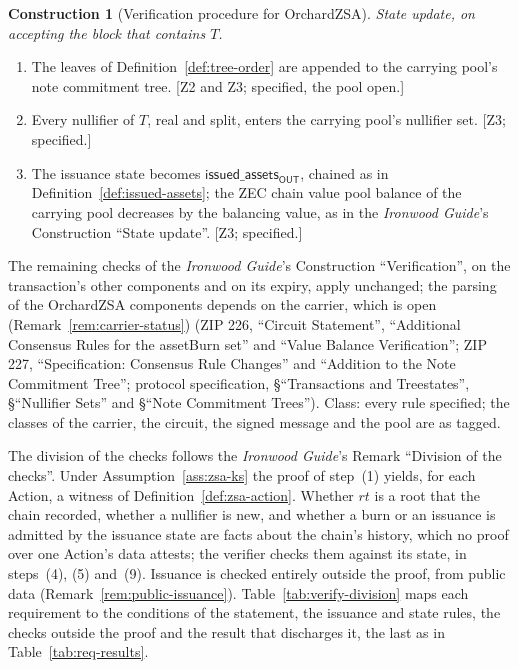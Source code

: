 \documentclass[11pt,a4paper]{article}
\theoremstyle{definition}
\newtheorem{construction}[theorem]{Construction}
\begin{document}
\begin{construction}[Verification procedure for OrchardZSA]
\emph{State update, on accepting the block that contains $T$.}
\begin{enumerate}[label=(\arabic*), leftmargin=2.4em, resume]
\item The leaves of Definition~\ref{def:tree-order} are appended to the
  carrying pool's note commitment tree. [Z2 and Z3; specified, the pool
  open.]
\item Every nullifier of $T$, real and split, enters the carrying pool's
  nullifier set. [Z3; specified.]
\item The issuance state becomes $\mathsf{issued\_assets}_{\mathsf{OUT}}$,
  chained as in Definition~\ref{def:issued-assets}; the ZEC chain value
  pool balance of the carrying pool decreases by the balancing value, as in
  the \emph{Ironwood Guide}'s Construction ``State update''. [Z3;
  specified.]
\end{enumerate}
The remaining checks of the \emph{Ironwood Guide}'s Construction
``Verification'', on the transaction's other components and on its expiry,
apply unchanged; the parsing of the OrchardZSA components depends on the
carrier, which is open (Remark~\ref{rem:carrier-status}) (ZIP 226,
``Circuit Statement'', ``Additional Consensus Rules for the assetBurn set''
and ``Value Balance Verification''; ZIP 227, ``Specification: Consensus Rule
Changes'' and ``Addition to the Note Commitment Tree''; protocol
specification, \S``Transactions and Treestates'', \S``Nullifier Sets'' and
\S``Note Commitment Trees''). Class: every rule specified; the classes of the
carrier, the circuit, the signed message and the pool are as tagged.
\end{construction}

The division of the checks follows the \emph{Ironwood Guide}'s Remark
``Division of the checks''. Under Assumption~\ref{ass:zsa-ks} the proof of
step~(1) yields, for each Action, a witness of
Definition~\ref{def:zsa-action}. Whether $\mathit{rt}$ is a root that the
chain recorded, whether a nullifier is new, and whether a burn or an
issuance is admitted by the issuance state are facts about the chain's
history, which no proof over one Action's data attests; the verifier checks
them against its state, in steps~(4), (5) and~(9). Issuance is checked
entirely outside the proof, from public data
(Remark~\ref{rem:public-issuance}). Table~\ref{tab:verify-division} maps
each requirement to the conditions of the statement, the issuance and state
rules, the checks outside the proof and the result that discharges it, the
last as in Table~\ref{tab:req-results}.
\end{document}
